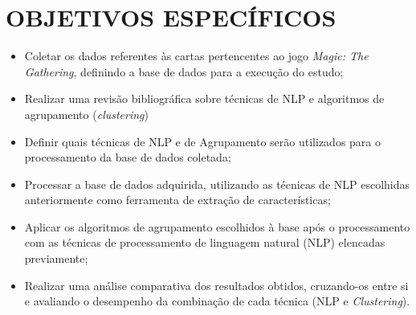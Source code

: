\section{OBJETIVOS ESPECÍFICOS}
\label{sec:objetivos_especificos}

\begin{itemize}

    \item Coletar os dados referentes às cartas pertencentes ao jogo \textit{Magic: The Gathering}, definindo a base de dados para a execução do estudo;
    \item Realizar uma revisão bibliográfica sobre técnicas de NLP e algoritmos de agrupamento (\textit{clustering})
    \item Definir quais técnicas de NLP e de Agrupamento serão utilizados para o processamento da base de dados coletada;
    \item Processar a base de dados adquirida, utilizando as técnicas de NLP escolhidas anteriormente como ferramenta de extração de características;
    \item Aplicar os algoritmos de agrupamento escolhidos à base após o processamento com as técnicas de processamento de linguagem natural (NLP) elencadas previamente;
    \item Realizar uma análise comparativa dos resultados obtidos, cruzando-os entre si e avaliando o desempenho da combinação de cada técnica (NLP e \textit{Clustering}).
\end{itemize}
